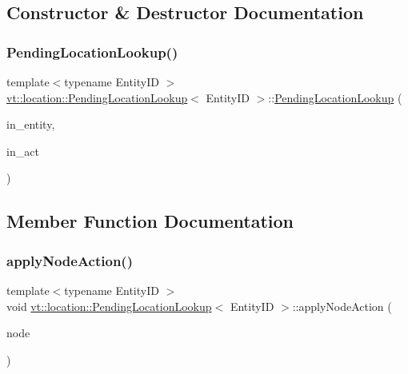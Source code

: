 \subsection{Constructor \& Destructor Documentation}
\mbox{\label{structvt_1_1location_1_1_pending_location_lookup_a31dee6a196bcc0fee50bdb983497b1f5}} 
\subsubsection{\texorpdfstring{Pending\+Location\+Lookup()}{PendingLocationLookup()}}
{\footnotesize\ttfamily template$<$typename Entity\+ID $>$ \\
\hyperlink{structvt_1_1location_1_1_pending_location_lookup}{vt\+::location\+::\+Pending\+Location\+Lookup}$<$ Entity\+ID $>$\+::\hyperlink{structvt_1_1location_1_1_pending_location_lookup}{Pending\+Location\+Lookup} (\begin{DoxyParamCaption}\item[{Entity\+ID const \&}]{in\+\_\+entity,  }\item[{\hyperlink{namespacevt_1_1location_a3a9235e0ceb341bef225d2cc46606e9e}{Node\+Action\+Type} const \&}]{in\+\_\+act }\end{DoxyParamCaption})\hspace{0.3cm}{\ttfamily [inline]}}



\subsection{Member Function Documentation}
\mbox{\label{structvt_1_1location_1_1_pending_location_lookup_a8e23682547f207d5403a0ee6a2224f37}} 
\subsubsection{\texorpdfstring{apply\+Node\+Action()}{applyNodeAction()}}
{\footnotesize\ttfamily template$<$typename Entity\+ID $>$ \\
void \hyperlink{structvt_1_1location_1_1_pending_location_lookup}{vt\+::location\+::\+Pending\+Location\+Lookup}$<$ Entity\+ID $>$\+::apply\+Node\+Action (\begin{DoxyParamCaption}\item[{\hyperlink{namespacevt_a866da9d0efc19c0a1ce79e9e492f47e2}{Node\+Type} const \&}]{node }\end{DoxyParamCaption})\hspace{0.3cm}{\ttfamily [inline]}}

